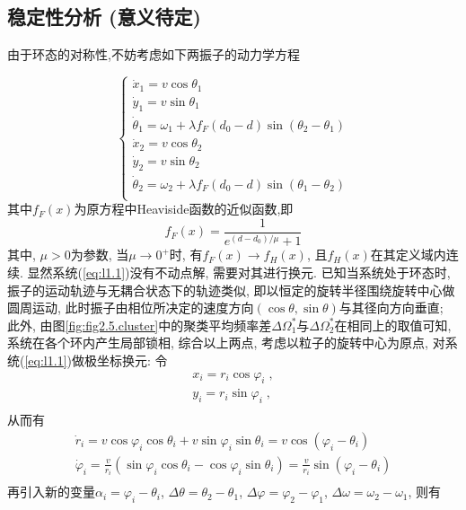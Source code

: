 \documentclass{article}
\begin{document}
\subsection{稳定性分析 (意义待定)}
由于环态的对称性,不妨考虑如下两振子的动力学方程

\begin{equation}\label{eq:l1.1}
	\begin{cases}
		\dot{x}_1=v\cos \theta _1\\
		\dot{y}_1=v\sin \theta _1\\
		\dot{\theta}_1=\omega _1+\lambda f_F\left( d_0-d \right) \sin \left( \theta _2-\theta _1 \right)\\
		\dot{x}_2=v\cos \theta _2\\
		\dot{y}_2=v\sin \theta _2\\
		\dot{\theta}_2=\omega _2+\lambda f_F\left( d_0-d \right) \sin \left( \theta _1-\theta _2 \right)\\
	\end{cases}
\end{equation}
其中$f_{F}\left( x \right)$为原方程中Heaviside函数的近似函数,即
$$
f_F\left( x \right) =\frac{1}{e^{\left( d-d_0 \right) /\mu}+1}
$$
其中, $\mu>0$为参数, 当$\mu\rightarrow0^{+}$时, 有$f_{F}\left( x \right)\rightarrow f_H\left( x \right)$, 且$f_H(x)$在其定义域内连续. 显然系统(\ref{eq:l1.1})没有不动点解, 需要对其进行换元. 已知当系统处于环态时, 振子的运动轨迹与无耦合状态下的轨迹类似, 即以恒定的旋转半径围绕旋转中心做圆周运动, 此时振子由相位所决定的速度方向$(\cos\theta, \sin\theta)$与其径向方向垂直; 此外, 由图\ref{fig:fig2.5.cluster}中的聚类平均频率差$\Delta \Omega _{1}^{*}$与$\Delta \Omega _{2}^{*}$在相同上的取值可知, 系统在各个环内产生局部锁相, 综合以上两点, 考虑以粒子的旋转中心为原点, 对系统(\ref{eq:l1.1})做极坐标换元: 令
$$
\begin{array}{c}
	x_i=r_i\cos \varphi _i\;,\\
	y_i=r_i\sin \varphi _i\;,\\
\end{array}
$$
从而有
$$
\begin{array}{c}
	\dot{r}_i=v\cos \varphi _i\cos \theta _i+v\sin \varphi _i\sin \theta _i=v\cos \left( \varphi _i-\theta _i \right)\\
	\dot{\varphi}_i=\frac{v}{r_i}\left( \sin \varphi _i\cos \theta _i-\cos \varphi _i\sin \theta _i \right) =\frac{v}{r_i}\sin \left( \varphi _i-\theta _i \right)\\
\end{array}
$$
再引入新的变量$\alpha_i=\varphi_i-\theta_i$, $\Delta \theta =\theta _2-\theta _1$, $\Delta \varphi =\varphi _2-\varphi _1$, $\Delta \omega =\omega _2-\omega _1$, 则有
\end{document}
